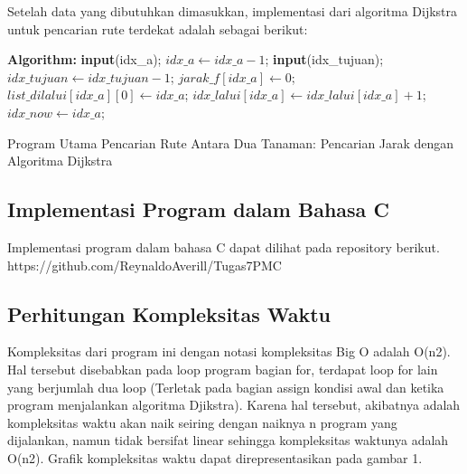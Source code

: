 \documentclass[conference]{IEEEtran}
\begin{document}
Setelah data yang dibutuhkan dimasukkan, implementasi dari algoritma Dijkstra untuk pencarian rute terdekat adalah sebagai berikut:
\setlength{\intextsep}{10pt} 
\begin{algorithm}
\DontPrintSemicolon
{\bf Algorithm: }\;
{\bf input}(idx\_a);\;
$idx\_a \leftarrow idx\_a-1$;\;
{\bf input}(idx\_tujuan);\;
$idx\_tujuan \leftarrow idx\_tujuan-1$;\;
$jarak\_f[idx\_a] \leftarrow 0$;\;
$list\_dilalui[idx\_a][0] \leftarrow idx\_a$;\;
$idx\_lalui[idx\_a] \leftarrow idx\_lalui[idx\_a]+1$;\;
$idx\_now \leftarrow idx\_a$;\;
\caption{Program Utama Pencarian Rute Antara Dua Tanaman: Pencarian Jarak dengan Algoritma Dijkstra\label{IR}}
\end{algorithm}

\subsection{Implementasi Program dalam Bahasa C}
Implementasi program dalam bahasa C dapat dilihat pada repository berikut. https://github.com/ReynaldoAverill/Tugas7PMC

\subsection{Perhitungan Kompleksitas Waktu}
Kompleksitas dari program ini dengan notasi kompleksitas Big O adalah O(n2). Hal tersebut disebabkan pada loop program bagian for, terdapat loop for lain yang berjumlah dua loop (Terletak pada bagian assign kondisi awal dan ketika program menjalankan algoritma Djikstra). Karena hal tersebut, akibatnya adalah kompleksitas waktu akan naik seiring dengan naiknya n program yang dijalankan, namun tidak bersifat linear sehingga kompleksitas waktunya adalah O(n2). Grafik kompleksitas waktu dapat direpresentasikan pada gambar 1.
\end{document}
